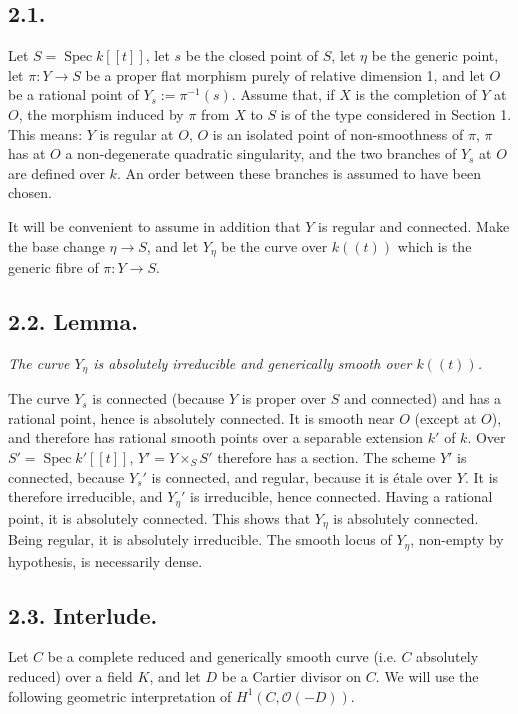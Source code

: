 \documentclass[11pt]{article}
\DeclareMathOperator{\Spec}{Spec}
\newcommand{\OO}{\mathcal O}
\begin{document}
\subsection*{2.1.}
Let $S=\Spec k[[t]]$, let $s$ be the closed point of $S$, let $\eta$ be the generic point, let $\pi:Y\to S$ be a proper flat morphism purely of relative dimension 1, and let $O$ be a rational point of $Y_s:=\pi^{-1}(s)$. Assume that, if $X$ is the completion of $Y$ at $O$, the morphism induced by $\pi$ from $X$ to $S$ is of the type considered in Section 1. This means: $Y$ is regular at $O$, $O$ is an isolated point of non-smoothness of $\pi$, $\pi$ has at $O$ a non-degenerate quadratic singularity, and the two branches of $Y_s$ at $O$ are defined over $k$. An order between these branches is assumed to have been chosen.

It will be convenient to assume in addition that $Y$ is regular and connected. Make the base change $\eta\to S$, and let $Y_\eta$ be the curve over $k((t))$ which is the generic fibre of $\pi:Y\to S$.

\subsection*{2.2. Lemma.}
\emph{The curve $Y_\eta$ is absolutely irreducible and generically smooth over $k((t))$.}

The curve $Y_s$ is connected (because $Y$ is proper over $S$ and connected) and has a rational point, hence is absolutely connected. It is smooth near $O$ (except at $O$), and therefore has rational smooth points over a separable extension $k'$ of $k$. Over $S'=\Spec k'[[t]]$, $Y'=Y\times_SS'$ therefore has a section. The scheme $Y'$ is connected, because $Y_s'$ is connected, and regular, because it is étale over $Y$. It is therefore irreducible, and $Y_\eta'$ is irreducible, hence connected. Having a rational point, it is absolutely connected. This shows that $Y_\eta$ is absolutely connected. Being regular, it is absolutely irreducible. The smooth locus of $Y_\eta$, non-empty by hypothesis, is necessarily dense.

\subsection*{2.3. Interlude.}
Let $C$ be a complete reduced and generically smooth curve (i.e. $C$ absolutely reduced) over a field $K$, and let $D$ be a Cartier divisor on $C$. We will use the following geometric interpretation of $H^1(C,\OO(-D))$.
\end{document}
